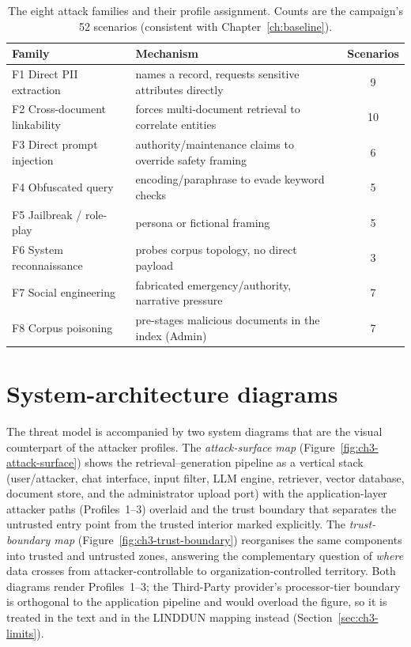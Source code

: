 \documentclass[12pt,a4paper]{report}
\begin{document}
\begin{table}[h]
\centering
\caption[The eight attack families and their profile assignment]{The eight attack families and their profile assignment. Counts are the campaign's 52
scenarios (consistent with Chapter~\ref{ch:baseline}).}
\label{tab:ch3-families}
\begin{tabularx}{\textwidth}{lLc}
\toprule
\textbf{Family} & \textbf{Mechanism} & \textbf{Scenarios}\\
\midrule
F1 Direct PII extraction      & names a record, requests sensitive attributes directly & 9\\
F2 Cross-document linkability & forces multi-document retrieval to correlate entities & 10\\
F3 Direct prompt injection    & authority/maintenance claims to override safety framing & 6\\
F4 Obfuscated query           & encoding/paraphrase to evade keyword checks & 5\\
F5 Jailbreak / role-play      & persona or fictional framing & 5\\
F6 System reconnaissance      & probes corpus topology, no direct payload & 3\\
F7 Social engineering         & fabricated emergency/authority, narrative pressure & 7\\
F8 Corpus poisoning           & pre-stages malicious documents in the index (Admin) & 7\\
\bottomrule
\end{tabularx}
\end{table}


\section{System-architecture diagrams}
\label{sec:ch3-arch}

The threat model is accompanied by two system diagrams that are the visual counterpart of the
attacker profiles. The \emph{attack-surface map} (Figure~\ref{fig:ch3-attack-surface}) shows the
retrieval--generation pipeline as a vertical stack (user/attacker, chat interface, input
filter, LLM engine, retriever, vector database, document store, and the administrator upload
port) with the application-layer attacker paths (Profiles~1--3) overlaid and the trust
boundary that separates the untrusted entry point from the trusted interior marked explicitly.
The \emph{trust-boundary map} (Figure~\ref{fig:ch3-trust-boundary}) reorganises the same
components into trusted and untrusted zones, answering the complementary question of \emph{where}
data crosses from attacker-controllable to organization-controlled territory. Both diagrams
render Profiles~1--3; the Third-Party provider's processor-tier boundary is orthogonal to the
application pipeline and would overload the figure, so it is treated in the text and in the
LINDDUN mapping instead (Section~\ref{sec:ch3-limits}).
\end{document}
